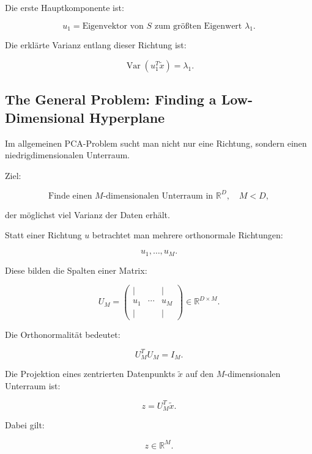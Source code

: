 \documentclass[11pt,a4paper]{scrartcl}
\begin{document}
\begin{answerbox}
    Die erste Hauptkomponente ist:

    \[
        \boxed{
            u_1
            =
            \text{Eigenvektor von } S \text{ zum größten Eigenwert } \lambda_1.
        }
    \]

    Die erklärte Varianz entlang dieser Richtung ist:

    \[
        \boxed{
            \operatorname{Var}(u_1^T\tilde x)
            =
            \lambda_1.
        }
    \]
\end{answerbox}

\subsection{The General Problem: Finding a Low-Dimensional Hyperplane}

\begin{notebox}
    Im allgemeinen PCA-Problem sucht man nicht nur eine Richtung, sondern einen
    niedrigdimensionalen Unterraum.

    Ziel:

    \[
        \text{Finde einen } M\text{-dimensionalen Unterraum in } \mathbb{R}^D,
        \quad M < D,
    \]

    der möglichst viel Varianz der Daten erhält.
\end{notebox}

\begin{solutionbox}
    Statt einer Richtung \(u\) betrachtet man mehrere orthonormale Richtungen:

    \[
        u_1,\dots,u_M.
    \]

    Diese bilden die Spalten einer Matrix:

    \[
        U_M
        =
        \begin{pmatrix}
        | & & | \\
        u_1 & \cdots & u_M \\
        | & & |
        \end{pmatrix}
        \in \mathbb{R}^{D \times M}.
    \]

    Die Orthonormalität bedeutet:

    \[
        U_M^T U_M = I_M.
    \]

    Die Projektion eines zentrierten Datenpunkts \(\tilde x\) auf den
    \(M\)-dimensionalen Unterraum ist:

    \[
        z
        =
        U_M^T \tilde x.
    \]

    Dabei gilt:

    \[
        z \in \mathbb{R}^M.
    \]
\end{solutionbox}
\end{document}
